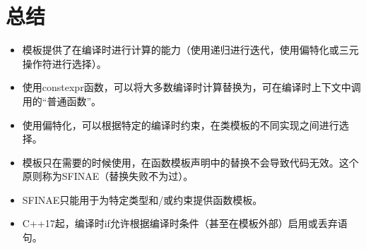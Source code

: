 \section{总结}

\begin{itemize}
\item 
模板提供了在编译时进行计算的能力（使用递归进行迭代，使用偏特化或三元操作符进行选择）。

\item 
使用constexpr函数，可以将大多数编译时计算替换为，可在编译时上下文中调用的“普通函数”。

\item 
使用偏特化，可以根据特定的编译时约束，在类模板的不同实现之间进行选择。

\item 
模板只在需要的时候使用，在函数模板声明中的替换不会导致代码无效。这个原则称为SFINAE（替换失败不为过）。

\item 
SFINAE只能用于为特定类型和/或约束提供函数模板。

\item 
C++17起，编译时if允许根据编译时条件（甚至在模板外部）启用或丢弃语句。
\end{itemize}